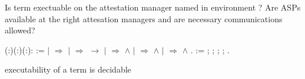 \documentclass[12pt]{report}
\begin{document}
 Is term  exectuable on the attestation manager named  in 
    environment ?  Are ASPs available at the right attesation managers
    and are necessary communications allowed? 
\begin{coqdoccode}
\coqdocemptyline
\coqdocnoindent
{} (:)(:)(:): :=\coqdoceol
\coqdocnoindent
{}  \coqdoceol
\coqdocnoindent
\ensuremath{|}    \ensuremath{\Rightarrow}    \coqdoceol
\coqdocnoindent
\ensuremath{|}    \ensuremath{\Rightarrow}     \ensuremath{\rightarrow}    \coqdoceol
\coqdocnoindent
\ensuremath{|}    \ensuremath{\Rightarrow}     \ensuremath{\land}    \coqdoceol
\coqdocnoindent
\ensuremath{|}  \coqdocvar{\_}   \ensuremath{\Rightarrow}     \ensuremath{\land}    \coqdoceol
\coqdocnoindent
\ensuremath{|}  \coqdocvar{\_}   \ensuremath{\Rightarrow}     \ensuremath{\land}    \coqdoceol
\coqdocnoindent
{}.\coqdoceol
\coqdocemptyline
\coqdocnoindent
{}   := ;  ;  ;  ; .\coqdoceol
\coqdocemptyline
\end{coqdoccode}
executability of a term is decidable 
\end{document}
